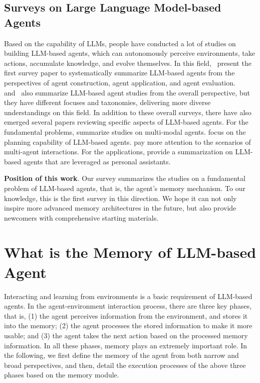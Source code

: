\documentclass{article}
\theoremstyle{definition}
\theoremstyle{theorem}
\theoremstyle{proof}
\theoremstyle{remark}
\begin{document}
	\subsection{Surveys on Large Language Model-based Agents}
	Based on the capability of LLMs, people have conducted a lot of studies on building LLM-based agents, which can autonomously perceive environments, take actions, accumulate knowledge, and evolve themselves. 
	In this field,~\citet{survey_llm_agent1} present the first survey paper to systematically summarize LLM-based agents from the perspectives of agent construction, agent application, and agent evaluation. 
	~\citet{survey_llm_agent2, survey_llm_agent5,survey_llm_agent6} and~\citet {survey_llm_agent8} also summarize LLM-based agent studies from the overall perspective, but they have different focuses and taxonomies, delivering more diverse understandings on this field.
	In addition to these overall surveys, there have also emerged several papers reviewing specific aspects of LLM-based agents.
	For the fundamental problems, \citet{survey_llm_agent7} summarize studies on multi-modal agents.
	\citet{survey_llm_agent_planning} focus on the planning capability of LLM-based agents.
	\citet{survey_llm_agent4} pay more attention to the scenarios of multi-agent interactions.
	For the applications, \citet{survey_llm_agent3} provide a summarization on LLM-based agents that are leveraged as personal assistants. 
	
	\textbf{Position of this work}. Our survey summarizes the studies on a fundamental problem of LLM-based agents, that is, the agent's memory mechanism. To our knowledge, this is the first survey in this direction.
	We hope it can not only inspire more advanced memory architectures in the future, but also provide newcomers with comprehensive starting materials.    
	
	\section{What is the Memory of LLM-based Agent}
	\label{sec:definition}
	Interacting and learning from environments is a basic requirement of LLM-based agents. 
	In the agent-environment interaction process, there are three key phases, that is, (1) the agent perceives information from the environment, and stores it into the memory; (2) the agent processes the stored information to make it more usable; and (3) the agent takes the next action based on the processed memory information. 
	In all these phases, memory plays an extremely important role.
	In the following, we first define the memory of the agent from both narrow and broad perspectives, and then, detail the execution processes of the above three phases based on the memory module.
	
\end{document}
